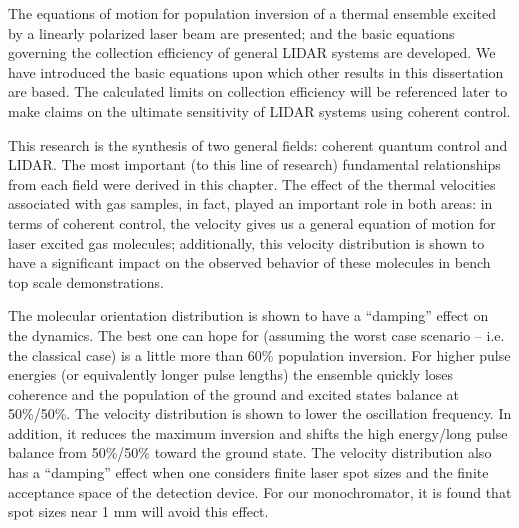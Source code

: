 The equations of motion for population inversion of a thermal ensemble excited by a linearly polarized laser beam are presented; and the basic equations governing the collection efficiency of general LIDAR systems are developed.
We have introduced the basic equations upon which other results in this dissertation are based. The calculated limits on collection efficiency will be referenced later to make claims on the ultimate sensitivity of LIDAR systems using coherent control.

This research is the synthesis of two general fields: coherent quantum control and LIDAR. The most important (to this line of research) fundamental relationships from each field were derived in this chapter. The effect of the thermal velocities associated with gas samples, in fact, played an important role in both areas: in terms of coherent control, the velocity gives us a general equation of motion for laser excited gas molecules; additionally, this velocity distribution is shown to have a significant impact on the observed behavior of these molecules in bench top scale demonstrations.

The molecular orientation distribution is shown to have a ``damping'' effect on the dynamics. The best one can hope for (assuming the worst case scenario -- i.e. the classical case) is a little more than 60\% population inversion. For higher pulse energies (or equivalently longer pulse lengths) the ensemble quickly loses coherence and the population of the ground and excited states balance at 50\%/50\%. The velocity distribution is shown to lower the oscillation frequency. In addition, it reduces the maximum inversion and shifts the high energy/long pulse balance from 50\%/50\% toward the ground state. The velocity distribution also has a ``damping'' effect when one considers finite laser spot sizes and the finite acceptance space of the detection device. For our monochromator, it is found that spot sizes near 1 mm will avoid this effect.

